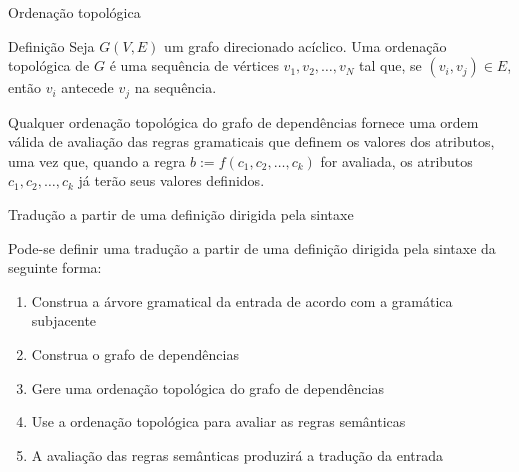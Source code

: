 \begin{frame}[fragile]{Ordenação topológica}

    \begin{block}{Definição}
        Seja $G(V, E)$ um grafo direcionado acíclico. Uma ordenação topológica de $G$ é uma sequência de vértices $v_1, v_2, \ldots, v_N$ tal que, se 
            $(v_i, v_j)\in E$, então $v_i$ antecede $v_j$ na sequência.
    \end{block}

    \vspace{0.2in}
    \pause

    Qualquer ordenação topológica do grafo de dependências fornece uma ordem válida de avaliação das regras gramaticais que definem os valores dos atributos, uma
        vez que, quando a regra $b := f(c_1, c_2, \ldots, c_k)$ for avaliada, os atributos $c_1, c_2, \ldots, c_k$ já terão seus valores definidos.
\end{frame}

\begin{frame}[fragile]{Tradução a partir de uma definição dirigida pela sintaxe}

    Pode-se definir uma tradução a partir de uma definição dirigida pela sintaxe da seguinte forma:
    \pause

    \vspace{0.2in}

    \begin{enumerate}
        \item Construa a árvore gramatical da entrada de acordo com a gramática subjacente
        \pause

        \item Construa o grafo de dependências
        \pause

        \item Gere uma ordenação topológica do grafo de dependências
        \pause

        \item Use a ordenação topológica para avaliar as regras semânticas
        \pause

        \item A avaliação das regras semânticas produzirá a tradução da entrada
    \end{enumerate}

\end{frame}
